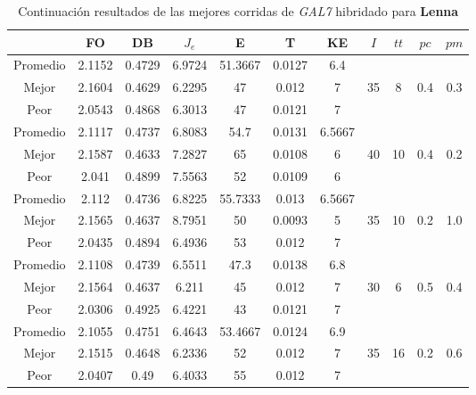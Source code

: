 \begin{table}[h!]
    \footnotesize
    \begin{center}
        \begin{tabular}{|c|c|c|c|c|c|c|c|c|c|c|}
        \hline
             & {\bf FO} & {\bf DB} & $J_e$ & {\bf E} & {\bf T} & {\bf KE} & $I$ & $tt$ & $pc$ & $pm$ \\
        \hline
        \hline
            Promedio  & 2.1152 & 0.4729 & 6.9724 & 51.3667 & 0.0127 & 6.4 &  &  &  & \\
            \cline{1-7}
            Mejor & 2.1604 & 0.4629  & 6.2295 & 47 & 0.012 & 7 & 35 & 8 & 0.4 & 0.3\\
            \cline{1-7}
            Peor & 2.0543 & 0.4868  & 6.3013 & 47 & 0.0121 & 7 &  &  &  & \\
        \hline
        \hline
            Promedio  & 2.1117 & 0.4737 & 6.8083 & 54.7 & 0.0131 & 6.5667 &  &  &  & \\
            \cline{1-7}
            Mejor & 2.1587 & 0.4633  & 7.2827 & 65 & 0.0108 & 6 & 40 & 10 & 0.4 & 0.2\\
            \cline{1-7}
            Peor & 2.041 & 0.4899  & 7.5563 & 52 & 0.0109 & 6 &  &  &  & \\
        \hline
        \hline
            Promedio  & 2.112 & 0.4736 & 6.8225 & 55.7333 & 0.013 & 6.5667 &  &  &  & \\
            \cline{1-7}
            Mejor & 2.1565 & 0.4637  & 8.7951 & 50 & 0.0093 & 5 & 35 & 10 & 0.2 & 1.0\\
            \cline{1-7}
            Peor & 2.0435 & 0.4894  & 6.4936 & 53 & 0.012 & 7 &  &  &  & \\
        \hline
        \hline
            Promedio  & 2.1108 & 0.4739 & 6.5511 & 47.3 & 0.0138 & 6.8 &  &  &  & \\
            \cline{1-7}
            Mejor & 2.1564 & 0.4637  & 6.211 & 45 & 0.012 & 7 & 30 & 6 & 0.5 & 0.4\\
            \cline{1-7}
            Peor & 2.0306 & 0.4925  & 6.4221 & 43 & 0.0121 & 7 &  &  &  & \\
        \hline
        \hline
            Promedio  & 2.1055 & 0.4751 & 6.4643 & 53.4667 & 0.0124 & 6.9 &  &  &  & \\
            \cline{1-7}
            Mejor & 2.1515 & 0.4648  & 6.2336 & 52 & 0.012 & 7 & 35 & 16 & 0.2 & 0.6\\
            \cline{1-7}
            Peor & 2.0407 & 0.49  & 6.4033 & 55 & 0.012 & 7 &  &  &  & \\
        \hline
        \end{tabular}
        \caption{Continuaci\'on resultados de las mejores corridas de \emph{GAL7} hibridado para {\bf Lenna}}
        \label{tb:tablecGAL7}
    \end{center}
\end{table}
